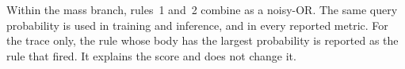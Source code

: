 Within the mass branch, rules~1 and~2 combine as a noisy-OR. The same query probability is used in training and inference, and in every reported metric. For the trace only, the rule whose body has the largest probability is reported as the rule that fired. It explains the score and does not change it.